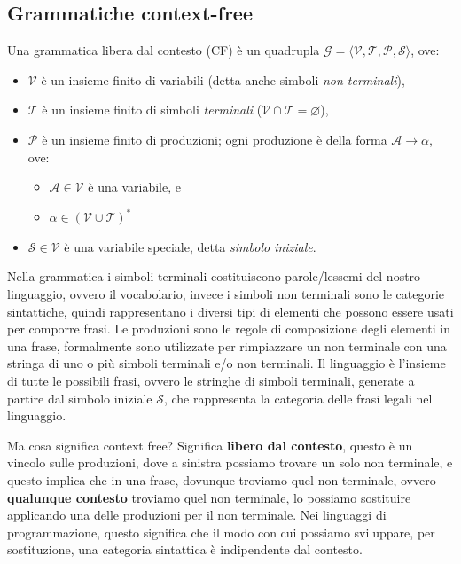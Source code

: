 \documentclass[oneside,a4paper,11pt]{book}
\theoremstyle{italicstyle}
\theoremstyle{normStyle}
\begin{document}
\subsection{Grammatiche context-free}
\begin{tcolorbox}
Una grammatica libera dal contesto (CF) è un quadrupla $\mathcal{G} = 
\langle \mathcal{V}, \mathcal{T}, \mathcal{P}, \mathcal{S} \rangle$, ove:
\begin{itemize}
  \item $\mathcal{V}$ è un insieme finito di variabili (detta anche simboli \textit{non terminali}),
  \item $\mathcal{T}$ è un insieme finito di simboli \textit{terminali} ($\mathcal{V}\cap \mathcal{T} = \varnothing$),
  \item $\mathcal{P}$ è un insieme finito di produzioni; ogni produzione 
  è della forma $\mathcal{A}\rightarrow \alpha$, ove:
  \begin{itemize}
    \item $\mathcal{A} \in \mathcal{V}$ è una variabile, e 
    \item $\alpha \in (\mathcal{V} \cup \mathcal{T})^*$
  \end{itemize}
  \item $\mathcal{S}\in \mathcal{V}$ è una variabile speciale, detta \textit{simbolo iniziale}.
\end{itemize}
\end{tcolorbox}
Nella grammatica i simboli terminali costituiscono
parole/lessemi del nostro linguaggio, ovvero il
vocabolario, invece i simboli non terminali sono le
categorie sintattiche, quindi rappresentano i diversi tipi di
elementi che possono essere usati per comporre frasi. Le
produzioni sono le regole di composizione degli elementi
in una frase, formalmente sono utilizzate per rimpiazzare
un non terminale con una stringa di uno o più simboli terminali 
e/o non terminali. Il linguaggio è l'insieme di tutte le possibili frasi,
ovvero le stringhe di simboli terminali, generate a partire 
dal simbolo iniziale $\mathcal{S}$, che rappresenta la categoria delle 
frasi legali nel linguaggio.

Ma cosa significa context free? Significa \textbf{libero dal contesto}, 
questo è un vincolo sulle produzioni, dove a sinistra possiamo 
trovare un solo non terminale, e questo implica che in una frase, 
dovunque troviamo quel non terminale, ovvero \textbf{qualunque contesto} 
troviamo quel non terminale, lo possiamo sostituire applicando 
una delle produzioni per il non terminale.
Nei linguaggi di programmazione, questo significa che il modo con cui possiamo 
sviluppare, per sostituzione, una categoria sintattica è indipendente dal contesto.
\end{document}
